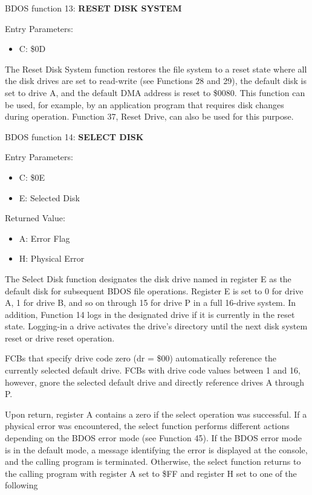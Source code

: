 BDOS function 13: \textbf{RESET DISK SYSTEM}

Entry Parameters:
\begin{itemize}
\item[] C: \$0D
\end{itemize}

The Reset Disk System function restores the file system to a reset
state where all the disk drives are set to read-write (see Functions
28 and 29), the default disk is set to drive A, and the default DMA
address is reset to \$0080. This function can be used, for example, by
an application program that requires disk changes during
operation. Function 37, Reset Drive, can also be used for this
purpose.

BDOS function 14: \textbf{SELECT DISK}

Entry Parameters:
\begin{itemize}
\item[] C: \$0E
\item[] E: Selected Disk
\end{itemize}

Returned Value:
\begin{itemize}
\item[] A: Error Flag
\item[] H: Physical Error
\end{itemize}

The Select Disk function designates the disk drive named in register E
as the default disk for subsequent BDOS file operations. Register E is
set to 0 for drive A, 1 for drive B, and so on through 15 for drive P
in a full 16-drive system. In addition, Function 14 logs in the
designated drive if it is currently in the reset state. Logging-in a
drive activates the drive's directory until the next disk system reset
or drive reset operation.

FCBs that specify drive code zero (dr = \$00) automatically reference
the currently selected default drive. FCBs with drive code values
between 1 and 16, however, gnore the selected default drive and
directly reference drives A through P.

Upon return, register A contains a zero if the select operation was
successful. If a physical error was encountered, the select function
performs different actions depending on the BDOS error mode (see
Function 45). If the BDOS error mode is in the default mode, a message
identifying the error is displayed at the console, and the calling
program is terminated. Otherwise, the select function returns to the
calling program with register A set to \$FF and register H set to one
of the following

